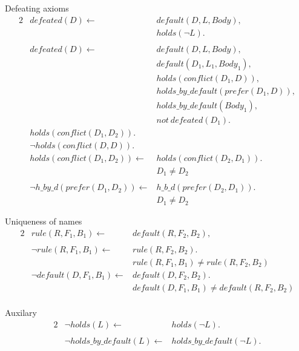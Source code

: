 \documentclass[11pt]{article}
\begin{document}
  Defeating axioms
  \begin{alignat}{2}
   & \label{eq:axiom9} defeated(D) \leftarrow & default(D,L,Body), \\       
   &                                          & holds(\neg L). \nonumber \\ \nonumber \\       
   & \label{eq:axiom10} defeated(D) \leftarrow & default(D, L, Body),\\       
   &                                             & default(D_1, L_1, Body_1), \nonumber \\ 
   &                                             & holds(conflict(D_1, D)), \nonumber \\ 
   &                                             & holds\_by\_default(prefer(D_1, D)), \nonumber \\ 
   &                                             & holds\_by\_default(Body_1), \nonumber \\ 
   &                                             & not~defeated(D_1). \nonumber \\
   & \label{eq:axiom11} holds(conflict(D_1, D_2)). &\\
   & \label{eq:axiom12} \neg holds(conflict(D, D)). &\\
   & \label{eq:axiom13} holds(conflict(D_1, D_2))  \leftarrow & holds(conflict(D_2, D_1)). \\
   &                                                          & D_1 \not= D_2 \nonumber \\ \nonumber \\ 
   & \label{eq:axiom14} \neg h\_by\_d(prefer(D_1, D_2)) \leftarrow & h\_b\_d(prefer(D_2, D_1)). \\
   &                                                                          & D_1 \not= D_2 \nonumber
  \end{alignat}


  Uniqueness of names
  \begin{alignat}{2}
   & \label{eq:axiom15} rule(R,F_1, B_1) \leftarrow & default(R,F_2,B_2), \\ \nonumber \\
   & \label{eq:axiom16} \neg rule(R,F_1, B_1) \leftarrow & rule(R, F_2, B_2). \\ 
   &                                                    & rule(R, F_1, B_1) \not= rule(R, F_2, B_2) \nonumber \\
   & \label{eq:axiom17} \neg default(D,F_1, B_1) \leftarrow & default(D, F_2, B_2). \\ 
   &                                                    & default(D, F_1, B_1) \not= default(R, F_2, B_2) \nonumber \\
  \end{alignat}

  Auxilary 
  \begin{alignat}{2}
   & \label{eq:axiom18} \neg holds(L) \leftarrow & holds(\neg L). \\ \nonumber \\
   & \label{eq:axiom18} \neg holds\_by\_default(L) \leftarrow & holds\_by\_default(\neg L).
  \end{alignat}
\end{document}
